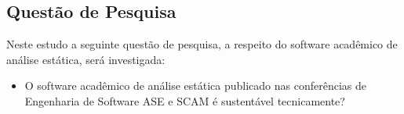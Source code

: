 
\subsection{Questão de Pesquisa}

Neste estudo a seguinte questão de pesquisa, a respeito do software acadêmico
de análise estática, será investigada:


\begin{itemize}
  \item O software acadêmico de análise estática publicado nas conferências de
  Engenharia de Software ASE e SCAM é sustentável tecnicamente?
\end{itemize}



